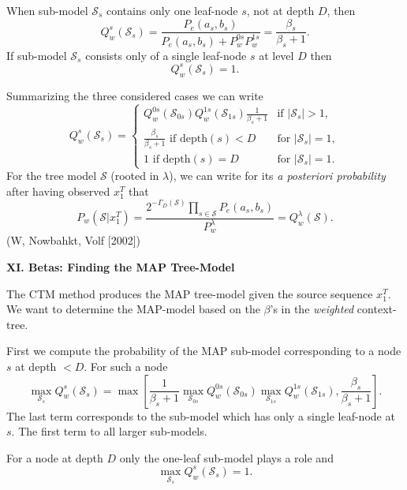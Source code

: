 \documentclass[a4paper,landscape]{slides} %
\newcommand{\cS}{{\mathcal{S}}}
\newcommand{\xT}{x_{1}^{T}}
\newcommand{\GD}{{\Gamma_{D}}}
\begin{document}
\begin{slide}
When sub-model $\cS_{s}$ contains only one leaf-node $s$, not at depth $D$, then
\begin{equation*}
Q_{w}^{s}(\cS_s)
= \frac{ P_e(a_s,b_s) }{ P_e(a_s,b_s) + P_{w}^{0s}P_{w}^{1s} }
= \frac{\beta_{s}}{\beta_{s}+1}.
\end{equation*}
If sub-model $\cS_{s}$ consists only of a single leaf-node $s$ at level $D$ then
\begin{equation*}
Q_{w}^{s}(\cS_s) = 1.
\end{equation*}

Summarizing the three considered cases we can write
\begin{equation*}
\label{eq:defaposteriori}
Q_{w}^{s}(\cS_{s})  =
\left\{\begin{array}{ll}
                Q_{w}^{0s}(\cS_{0s}) Q_{w}^{1s}(\cS_{1s}) \frac{1}{\beta_{s}+1}
                &\mbox{if $|\cS_s|>1$}, \\
                \frac{\beta_{s}}{\beta_{s}+1} \mbox{ if depth$(s)<D$}
                &\mbox{for $|\cS_s|=1$}, \\
                1 \mbox{ if depth$(s)=D$}
                &\mbox{for $|\cS_s|=1$}.
       \end{array} \right.
\end{equation*}
For the tree model $\cS$ (rooted in $\lambda$), we can write for its {\em a posteriori probability} after having observed $\xT$ that
\begin{equation*}
P_{w}(\cS|\xT) = \frac{2^{-\GD(\cS)} \prod_{s\in\cS} P_e(a_s,b_s)
} { P_{w}^{\lambda} } = Q_{w}^{\lambda}(\cS).
\end{equation*}
(W, Nowbahkt, Volf [2002])
\end{slide}
\begin{slide}
\end{slide}
\begin{slide}{\bf\Large\color{blue} XI. Betas: Finding the MAP Tree-Model}

The CTM method produces the MAP tree-model given the source sequence $\xT$.
We want to determine the MAP-model based on the $\beta$'s in the {\em weighted} context-tree.

First we compute the probability of the MAP sub-model corresponding to a node $s$ at depth $<D$.
For such a node
\begin{equation*}
\max_{\cS_s} Q_{w}^{s}(\cS_{s}) = \max [ \frac{1}{\beta_{s}+1} \max_{\cS_{0s}} Q_{w}^{0s}(\cS_{0s}) \max_{\cS_{1s}} Q_{w}^{1s}(\cS_{1s}) , \frac{\beta_s}{\beta_{s}+1} ].
\end{equation*}
The last term corresponds to the sub-model which has only a single leaf-node at $s$.
The first term to all larger sub-models.

For a node at depth $D$ only the one-leaf sub-model plays a role and
\begin{equation*}
\max_{\cS_s} Q_{w}^{s}(\cS_{s}) = 1.
\end{equation*}
\end{slide}
\end{document}
